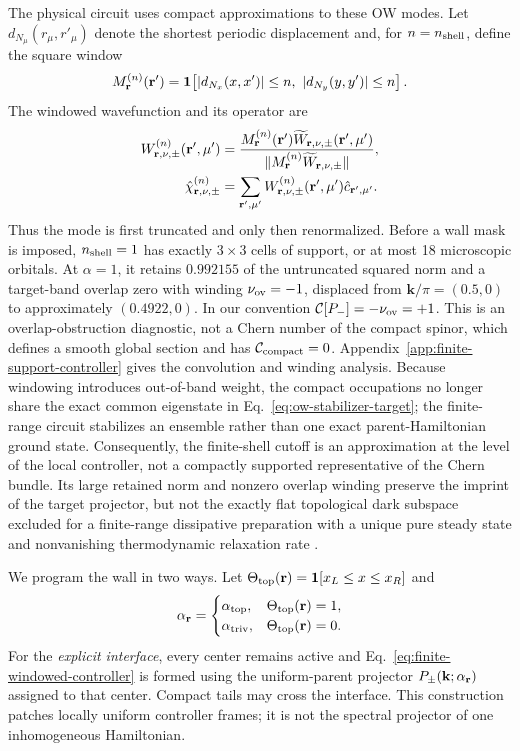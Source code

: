 \documentclass[aps,prx,twocolumn,superscriptaddress,longbibliography,nofootinbib,floatfix]{revtex4-2}
\newcommand{\mbf}[1]{\mathbf{#1}}
\newcommand{\h}[1]{\hat{#1}}
\newcommand{\bfr}{{\bf r}}
\begin{document}
The physical circuit uses compact approximations to these OW modes.  Let
\(d_{N_\mu}(r_\mu,r'_\mu)\) denote the shortest periodic displacement and,
for \(n=n_{\rm shell}\), define the square window
\begin{equation}
 M_{\bfr}^{(n)}(\bfr')=
 \mathbf{1}\!\left[
 |d_{N_x}(x,x')|\le n,\ 
 |d_{N_y}(y,y')|\le n\right].
 \label{eq:controller-square-window}
\end{equation}
The windowed wavefunction and its operator are
\begin{align}
 W^{(n)}_{\bfr,\nu,\pm}(\bfr',\mu')
 &=
 \frac{M_{\bfr}^{(n)}(\bfr')
 \widetilde W_{\bfr,\nu,\pm}(\bfr',\mu')}
 {\|M_{\bfr}^{(n)}\widetilde W_{\bfr,\nu,\pm}\|},
 \nonumber\\
 \h\chi^{(n)}_{\bfr,\nu,\pm}
 &=\sum_{\bfr',\mu'}W^{(n)}_{\bfr,\nu,\pm}(\bfr',\mu')
 \h c_{\bfr',\mu'}.
 \label{eq:finite-windowed-controller}
\end{align}
Thus the mode is first truncated and only then renormalized.  Before a wall
mask is imposed, \(n_{\rm shell}=1\) has exactly \(3\times3\) cells of support,
or at most 18 microscopic orbitals.  At \(\alpha=1\), it retains \(0.992155\)
of the untruncated squared norm and a target-band overlap zero with winding
\(\nu_{\rm ov}=-1\), displaced from \(\mbf k/\pi=(0.5,0)\) to approximately
\((0.4922,0)\).  In our convention
\(\mathcal C[P_-]=-\nu_{\rm ov}=+1\).  This is an overlap-obstruction
diagnostic, not a Chern number of the compact spinor, which defines a smooth
global section and has \(\mathcal C_{\rm compact}=0\).
Appendix~\ref{app:finite-support-controller} gives the convolution and winding
analysis.  Because windowing introduces out-of-band weight, the compact
occupations no longer share the exact common eigenstate in
Eq.~\eqref{eq:ow-stabilizer-target}; the finite-range circuit stabilizes an
ensemble rather than one exact parent-Hamiltonian ground state.
Consequently, the finite-shell cutoff is an approximation at the level of
the local controller, not a compactly supported representative of the Chern
bundle.  Its large retained norm and nonzero overlap winding preserve the
imprint of the target projector, but not the exactly flat topological dark
subspace excluded for a finite-range dissipative preparation with a unique
pure steady state and nonvanishing thermodynamic relaxation rate
\cite{Goldstein2019}.

We program the wall in two ways.  Let
\(\Theta_{\rm top}(\bfr)=\mathbf{1}[x_L\le x\le x_R]\) and
\begin{equation}
 \alpha_{\bfr}=
 \begin{cases}
  \alpha_{\rm top},&\Theta_{\rm top}(\bfr)=1,\\
  \alpha_{\rm triv},&\Theta_{\rm top}(\bfr)=0.
 \end{cases}
 \label{eq:controller-slab}
\end{equation}
For the \emph{explicit interface}, every center remains active and
Eq.~\eqref{eq:finite-windowed-controller} is formed using the uniform-parent
projector \(P_\pm(\mbf k;\alpha_{\bfr})\) assigned to that center.  Compact
tails may cross the interface.  This construction patches locally uniform
controller frames; it is not the spectral projector of one inhomogeneous
Hamiltonian.
\end{document}
